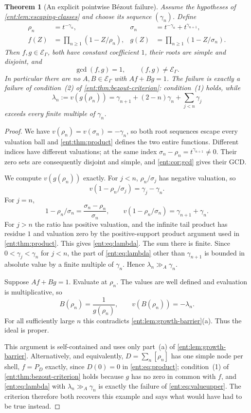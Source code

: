 \documentclass[11pt]{article}
\newtheorem{theorem}{Theorem}[section]
\theoremstyle{plain}
\theoremstyle{plain}
\theoremstyle{plain}
\theoremstyle{definition}
\theoremstyle{definition}
\theoremstyle{definition}
\theoremstyle{definition}
\theoremstyle{remark}
\newcommand{\E}{\mathcal E_\Gamma}
\newcommand{\ggA}{\mathrel{\gg_{\!A}}}
\begin{document}
\begin{theorem}[An explicit pointwise B\'ezout failure]
\label{ent:thm:no-bezout}
Assume the hypotheses of \cref{ent:lem:escaping-classes} and choose its
sequence $(\gamma_n)$. Define
\begin{align}
 \rho_n&=t^{-\gamma_n},&
 \sigma_n&=t^{-\gamma_n}+t^{\gamma_{n+1}},\label{ent:eq:paired-roots}\\
 f(Z)&=\prod_{n\ge1}(1-Z/\rho_n),&
 g(Z)&=\prod_{n\ge1}(1-Z/\sigma_n).\label{ent:eq:paired-products}
\end{align}
Then $f,g\in\E$, both have constant coefficient $1$, their roots are simple
and disjoint, and
\[
 \gcd(f,g)=1,\qquad (f,g)\ne\E.
\]
In particular there are no $A,B\in\E$ with $Af+Bg=1$. The failure is exactly
a failure of condition~(2) of \cref{ent:thm:bezout-criterion}: condition~(1)
holds, while
\begin{equation}\label{ent:eq:lambda}
 \lambda_n:=v(g(\rho_n))
   =\gamma_{n+1}+(2-n)\gamma_n+\sum_{j<n}\gamma_j
\end{equation}
exceeds every finite multiple of $\gamma_n$.
\end{theorem}
\begin{proof}
We have $v(\rho_n)=v(\sigma_n)=-\gamma_n$, so both root sequences escape
every valuation ball and \cref{ent:thm:product} defines the two entire
functions. Different indices have different valuations; at the same index
$\sigma_n-\rho_n=t^{\gamma_{n+1}}\ne0$. Their zero sets are consequently
disjoint and simple, and \cref{ent:cor:gcd} gives their GCD.

We compute $v(g(\rho_n))$ exactly. For $j<n$, $\rho_n/\sigma_j$ has negative
valuation, so
\[
 v(1-\rho_n/\sigma_j)=\gamma_j-\gamma_n.
\]
For $j=n$,
\[
 1-\rho_n/\sigma_n=\frac{\sigma_n-\rho_n}{\sigma_n},\qquad
 v(1-\rho_n/\sigma_n)=\gamma_{n+1}+\gamma_n.
\]
For $j>n$ the ratio has positive valuation, and the infinite tail product has
residue $1$ and valuation zero by the positive-support product argument used
in \cref{ent:thm:product}. This gives \eqref{ent:eq:lambda}.
The sum there is finite. Since $0<\gamma_j<\gamma_n$ for $j<n$, the part of
\eqref{ent:eq:lambda} other than $\gamma_{n+1}$ is bounded in absolute value
by a finite multiple of $\gamma_n$. Hence $\lambda_n\ggA\gamma_n$.

Suppose $Af+Bg=1$. Evaluate at $\rho_n$. The values are well defined and
evaluation is multiplicative, so
\[
 B(\rho_n)=\frac1{g(\rho_n)},\qquad
 v(B(\rho_n))=-\lambda_n.
\]
For all sufficiently large $n$ this contradicts
\cref{ent:lem:growth-barrier}(a). Thus the ideal is proper.

This argument is self-contained and uses only part~(a) of
\cref{ent:lem:growth-barrier}. Alternatively, and equivalently,
$D=\sum_n[\rho_n]$ has one simple node per shell, $f=P_D$ exactly, since
$D(0)=0$ in \eqref{ent:eq:product}; condition~(1) of
\cref{ent:thm:bezout-criterion} holds because $g$ has no zero in common with
$f$, and \eqref{ent:eq:lambda} with $\lambda_n\ggA\gamma_n$ is exactly the
failure of \eqref{ent:eq:valueupper}. The criterion therefore both recovers
this example and says what would have had to be true instead.
\end{proof}
\end{document}

